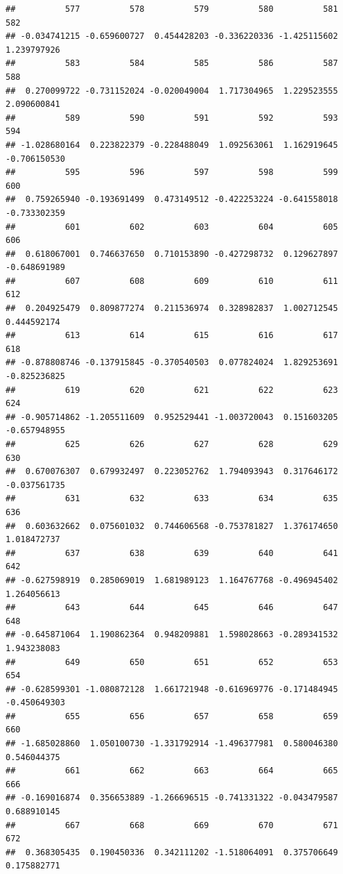 \documentclass[
]{article}
\begin{document}
\begin{verbatim}
##          577          578          579          580          581          582 
## -0.034741215 -0.659600727  0.454428203 -0.336220336 -1.425115602  1.239797926 
##          583          584          585          586          587          588 
##  0.270099722 -0.731152024 -0.020049004  1.717304965  1.229523555  2.090600841 
##          589          590          591          592          593          594 
## -1.028680164  0.223822379 -0.228488049  1.092563061  1.162919645 -0.706150530 
##          595          596          597          598          599          600 
##  0.759265940 -0.193691499  0.473149512 -0.422253224 -0.641558018 -0.733302359 
##          601          602          603          604          605          606 
##  0.618067001  0.746637650  0.710153890 -0.427298732  0.129627897 -0.648691989 
##          607          608          609          610          611          612 
##  0.204925479  0.809877274  0.211536974  0.328982837  1.002712545  0.444592174 
##          613          614          615          616          617          618 
## -0.878808746 -0.137915845 -0.370540503  0.077824024  1.829253691 -0.825236825 
##          619          620          621          622          623          624 
## -0.905714862 -1.205511609  0.952529441 -1.003720043  0.151603205 -0.657948955 
##          625          626          627          628          629          630 
##  0.670076307  0.679932497  0.223052762  1.794093943  0.317646172 -0.037561735 
##          631          632          633          634          635          636 
##  0.603632662  0.075601032  0.744606568 -0.753781827  1.376174650  1.018472737 
##          637          638          639          640          641          642 
## -0.627598919  0.285069019  1.681989123  1.164767768 -0.496945402  1.264056613 
##          643          644          645          646          647          648 
## -0.645871064  1.190862364  0.948209881  1.598028663 -0.289341532  1.943238083 
##          649          650          651          652          653          654 
## -0.628599301 -1.080872128  1.661721948 -0.616969776 -0.171484945 -0.450649303 
##          655          656          657          658          659          660 
## -1.685028860  1.050100730 -1.331792914 -1.496377981  0.580046380  0.546044375 
##          661          662          663          664          665          666 
## -0.169016874  0.356653889 -1.266696515 -0.741331322 -0.043479587  0.688910145 
##          667          668          669          670          671          672 
##  0.368305435  0.190450336  0.342111202 -1.518064091  0.375706649  0.175882771 

\end{verbatim}
\end{document}
